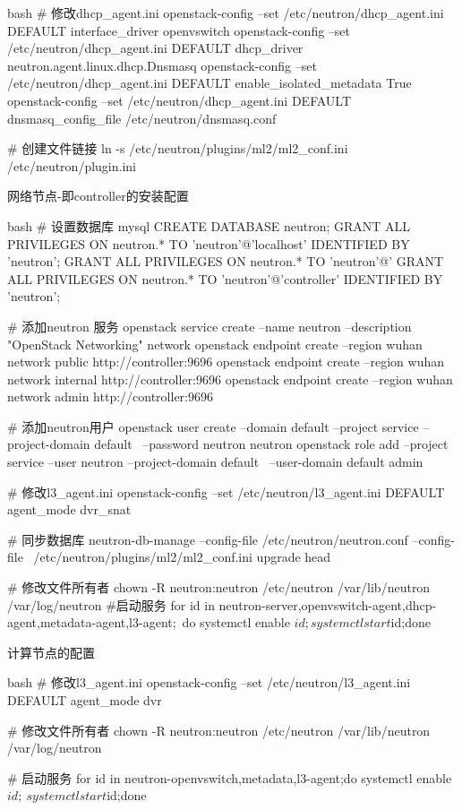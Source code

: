 \begin{outline}[enumerate]
\begin{code-in-enumerate}{bash}
# 修改dhcp_agent.ini
openstack-config --set /etc/neutron/dhcp_agent.ini DEFAULT interface_driver openvswitch
openstack-config --set /etc/neutron/dhcp_agent.ini DEFAULT dhcp_driver neutron.agent.linux.dhcp.Dnsmasq
openstack-config --set /etc/neutron/dhcp_agent.ini DEFAULT enable_isolated_metadata True
openstack-config --set /etc/neutron/dhcp_agent.ini DEFAULT dnsmasq_config_file /etc/neutron/dnsmasq.conf

# 创建文件链接
ln -s /etc/neutron/plugins/ml2/ml2_conf.ini /etc/neutron/plugin.ini
\end{code-in-enumerate}

\1 网络节点-即controller的安装配置
\begin{code-in-enumerate}{bash}
# 设置数据库
mysql
CREATE DATABASE neutron;
GRANT ALL PRIVILEGES ON neutron.* TO 'neutron'@'localhost' IDENTIFIED BY 'neutron';
GRANT ALL PRIVILEGES ON neutron.* TO 'neutron'@'%
GRANT ALL PRIVILEGES ON neutron.* TO 'neutron'@'controller' IDENTIFIED BY 'neutron';

# 添加neutron 服务
openstack service create --name neutron --description "OpenStack Networking" network
openstack endpoint create --region wuhan network public http://controller:9696
openstack endpoint create --region wuhan network internal http://controller:9696
openstack endpoint create --region wuhan network admin http://controller:9696

# 添加neutron用户
openstack user create --domain default --project service --project-domain default \
    --password neutron neutron
openstack role add --project service --user neutron --project-domain default \
    --user-domain default admin

# 修改l3_agent.ini
openstack-config --set /etc/neutron/l3_agent.ini DEFAULT agent_mode dvr_snat

# 同步数据库
neutron-db-manage --config-file /etc/neutron/neutron.conf --config-file \
    /etc/neutron/plugins/ml2/ml2_conf.ini upgrade head

# 修改文件所有者
chown -R neutron:neutron /etc/neutron /var/lib/neutron /var/log/neutron
#启动服务
for id in neutron-{server,openvswitch-agent,dhcp-agent,metadata-agent,l3-agent};\
    do systemctl enable $id;systemctl start $id;done
\end{code-in-enumerate}

\1 计算节点的配置
\begin{code-in-enumerate}{bash}
# 修改l3_agent.ini
openstack-config --set /etc/neutron/l3_agent.ini DEFAULT agent_mode dvr

# 修改文件所有者
chown -R neutron:neutron /etc/neutron /var/lib/neutron /var/log/neutron

# 启动服务
for id in neutron-{openvswitch,metadata,l3}-agent;do systemctl enable $id;\
    systemctl start $id;done
\end{code-in-enumerate}

\end{outline}

